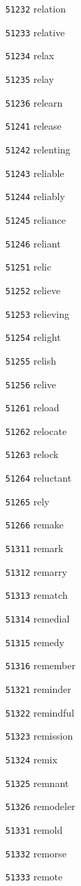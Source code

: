 \documentclass[twoside,11pt]{article}
\begin{document}
\begin{multicols}{5}
\begin{enumerate}
\item[\texttt{51232}] relation
\item[\texttt{51233}] relative
\item[\texttt{51234}] relax
\item[\texttt{51235}] relay
\item[\texttt{51236}] relearn
\item[\texttt{51241}] release
\item[\texttt{51242}] relenting
\item[\texttt{51243}] reliable
\item[\texttt{51244}] reliably
\item[\texttt{51245}] reliance
\item[\texttt{51246}] reliant
\item[\texttt{51251}] relic
\item[\texttt{51252}] relieve
\item[\texttt{51253}] relieving
\item[\texttt{51254}] relight
\item[\texttt{51255}] relish
\item[\texttt{51256}] relive
\item[\texttt{51261}] reload
\item[\texttt{51262}] relocate
\item[\texttt{51263}] relock
\item[\texttt{51264}] reluctant
\item[\texttt{51265}] rely
\item[\texttt{51266}] remake
\item[\texttt{51311}] remark
\item[\texttt{51312}] remarry
\item[\texttt{51313}] rematch
\item[\texttt{51314}] remedial
\item[\texttt{51315}] remedy
\item[\texttt{51316}] remember
\item[\texttt{51321}] reminder
\item[\texttt{51322}] remindful
\item[\texttt{51323}] remission
\item[\texttt{51324}] remix
\item[\texttt{51325}] remnant
\item[\texttt{51326}] remodeler
\item[\texttt{51331}] remold
\item[\texttt{51332}] remorse
\item[\texttt{51333}] remote

\end{enumerate}
\end{multicols}
\end{document}

